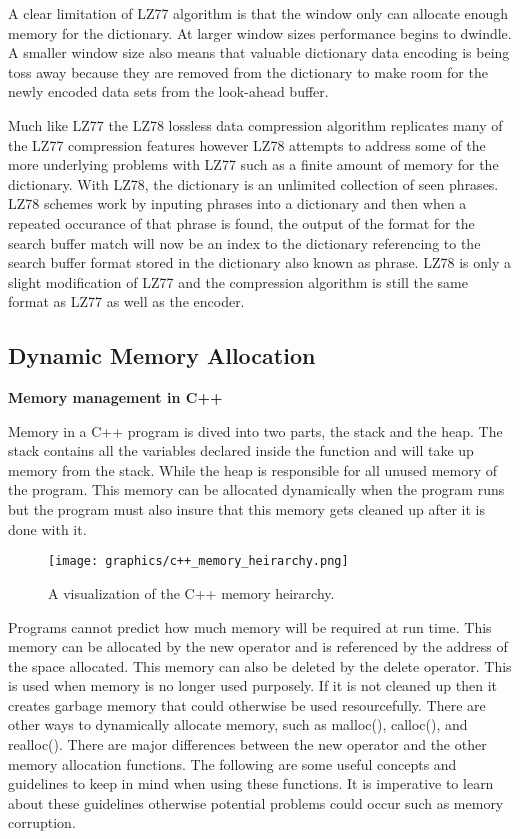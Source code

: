 \documentclass[letterpaper, 12pt]{article}
\begin{document}
A clear limitation of LZ77 algorithm is that the window only can allocate enough memory for the dictionary. At
larger window sizes performance begins to dwindle. A smaller window size also means that valuable dictionary data
encoding is being toss away because they are removed from the dictionary to make room for the newly encoded data sets
from the look-ahead buffer.
\par\vspace{\baselineskip}
Much like LZ77 the LZ78 lossless data compression algorithm replicates many of the LZ77 compression features however
LZ78 attempts to address some of the more underlying problems with LZ77 such as a finite amount of memory for
the dictionary. With LZ78, the dictionary is an unlimited collection of seen phrases. LZ78 schemes work by inputing
phrases into a dictionary and then when a repeated occurance of that phrase is found, the output of the format for
the search buffer match will now be an index to the dictionary referencing to the search buffer format stored in
the dictionary also known as phrase. LZ78 is only a slight modification of LZ77 and the compression algorithm is still
the same format as LZ77 as well as the encoder.

\newpage

\subsection{Dynamic Memory Allocation}
{\bfseries Memory management in C++}
\par\vspace{\baselineskip}
Memory in a C++ program is dived into two parts, the stack and the heap. The stack contains all the 
variables declared inside the function and will take up memory from the stack. While the heap is responsible 
for all unused memory of the program. This memory can be allocated dynamically when the program runs but 
the program must also insure that this memory gets cleaned up after it is done with it.
\begin{figure}
  \centering
  \texttt{[image: graphics/c++\_memory\_heirarchy.png]}
  \label{fig:cpp_mem_heirarchy}
  \caption{A visualization of the C++ memory heirarchy.}
\end{figure}

Programs cannot predict how much memory will be required at run time. This memory can be allocated 
by the new operator and is referenced by the address of the space allocated. This memory can 
also be deleted by the delete operator. This is used when memory is no longer used purposely. 
If it is not cleaned up then it creates garbage memory that could otherwise be used resourcefully. 
There are other ways to dynamically allocate memory, such as malloc(), calloc(), and realloc(). 
There are major differences between the new operator and the other memory allocation functions.  
The following are some useful concepts and guidelines to keep in mind when using these functions. 
It is imperative to learn about these guidelines otherwise potential problems could occur 
such as memory corruption. \cite{newerror}
\end{document}
